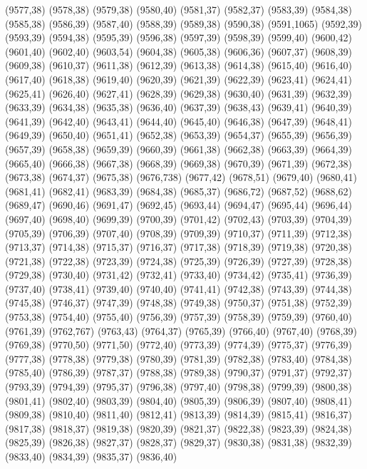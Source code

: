 (9577,38)
(9578,38)
(9579,38)
(9580,40)
(9581,37)
(9582,37)
(9583,39)
(9584,38)
(9585,38)
(9586,39)
(9587,40)
(9588,39)
(9589,38)
(9590,38)
(9591,1065)
(9592,39)
(9593,39)
(9594,38)
(9595,39)
(9596,38)
(9597,39)
(9598,39)
(9599,40)
(9600,42)
(9601,40)
(9602,40)
(9603,54)
(9604,38)
(9605,38)
(9606,36)
(9607,37)
(9608,39)
(9609,38)
(9610,37)
(9611,38)
(9612,39)
(9613,38)
(9614,38)
(9615,40)
(9616,40)
(9617,40)
(9618,38)
(9619,40)
(9620,39)
(9621,39)
(9622,39)
(9623,41)
(9624,41)
(9625,41)
(9626,40)
(9627,41)
(9628,39)
(9629,38)
(9630,40)
(9631,39)
(9632,39)
(9633,39)
(9634,38)
(9635,38)
(9636,40)
(9637,39)
(9638,43)
(9639,41)
(9640,39)
(9641,39)
(9642,40)
(9643,41)
(9644,40)
(9645,40)
(9646,38)
(9647,39)
(9648,41)
(9649,39)
(9650,40)
(9651,41)
(9652,38)
(9653,39)
(9654,37)
(9655,39)
(9656,39)
(9657,39)
(9658,38)
(9659,39)
(9660,39)
(9661,38)
(9662,38)
(9663,39)
(9664,39)
(9665,40)
(9666,38)
(9667,38)
(9668,39)
(9669,38)
(9670,39)
(9671,39)
(9672,38)
(9673,38)
(9674,37)
(9675,38)
(9676,738)
(9677,42)
(9678,51)
(9679,40)
(9680,41)
(9681,41)
(9682,41)
(9683,39)
(9684,38)
(9685,37)
(9686,72)
(9687,52)
(9688,62)
(9689,47)
(9690,46)
(9691,47)
(9692,45)
(9693,44)
(9694,47)
(9695,44)
(9696,44)
(9697,40)
(9698,40)
(9699,39)
(9700,39)
(9701,42)
(9702,43)
(9703,39)
(9704,39)
(9705,39)
(9706,39)
(9707,40)
(9708,39)
(9709,39)
(9710,37)
(9711,39)
(9712,38)
(9713,37)
(9714,38)
(9715,37)
(9716,37)
(9717,38)
(9718,39)
(9719,38)
(9720,38)
(9721,38)
(9722,38)
(9723,39)
(9724,38)
(9725,39)
(9726,39)
(9727,39)
(9728,38)
(9729,38)
(9730,40)
(9731,42)
(9732,41)
(9733,40)
(9734,42)
(9735,41)
(9736,39)
(9737,40)
(9738,41)
(9739,40)
(9740,40)
(9741,41)
(9742,38)
(9743,39)
(9744,38)
(9745,38)
(9746,37)
(9747,39)
(9748,38)
(9749,38)
(9750,37)
(9751,38)
(9752,39)
(9753,38)
(9754,40)
(9755,40)
(9756,39)
(9757,39)
(9758,39)
(9759,39)
(9760,40)
(9761,39)
(9762,767)
(9763,43)
(9764,37)
(9765,39)
(9766,40)
(9767,40)
(9768,39)
(9769,38)
(9770,50)
(9771,50)
(9772,40)
(9773,39)
(9774,39)
(9775,37)
(9776,39)
(9777,38)
(9778,38)
(9779,38)
(9780,39)
(9781,39)
(9782,38)
(9783,40)
(9784,38)
(9785,40)
(9786,39)
(9787,37)
(9788,38)
(9789,38)
(9790,37)
(9791,37)
(9792,37)
(9793,39)
(9794,39)
(9795,37)
(9796,38)
(9797,40)
(9798,38)
(9799,39)
(9800,38)
(9801,41)
(9802,40)
(9803,39)
(9804,40)
(9805,39)
(9806,39)
(9807,40)
(9808,41)
(9809,38)
(9810,40)
(9811,40)
(9812,41)
(9813,39)
(9814,39)
(9815,41)
(9816,37)
(9817,38)
(9818,37)
(9819,38)
(9820,39)
(9821,37)
(9822,38)
(9823,39)
(9824,38)
(9825,39)
(9826,38)
(9827,37)
(9828,37)
(9829,37)
(9830,38)
(9831,38)
(9832,39)
(9833,40)
(9834,39)
(9835,37)
(9836,40)
